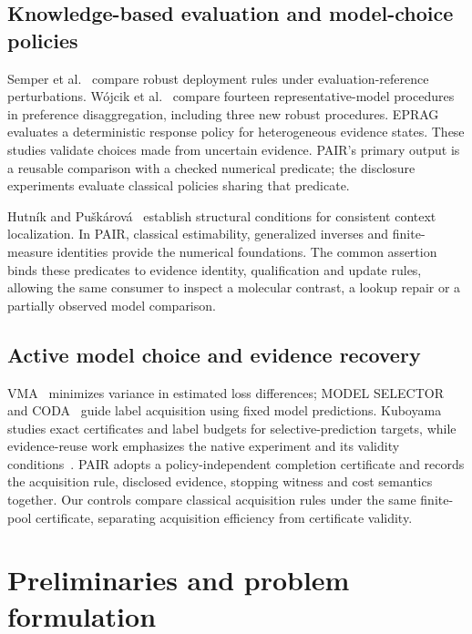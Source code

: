 \documentclass[preprint,12pt,number,sort&compress]{elsarticle}
\begin{document}
\subsection{Knowledge-based evaluation and model-choice policies}
Semper et al.~\cite{semper2026robust} compare robust deployment rules under evaluation-reference perturbations. W\'{o}jcik et al.~\cite{wojcik2023representative} compare fourteen representative-model procedures in preference disaggregation, including three new robust procedures. EPRAG~\cite{kinalioglu2026eprag} evaluates a deterministic response policy for heterogeneous evidence states. These studies validate choices made from uncertain evidence. PAIR's primary output is a reusable comparison with a checked numerical predicate; the disclosure experiments evaluate classical policies sharing that predicate.

Hutn\'{i}k and Pu\v{s}k\'{a}rov\'{a}~\cite{hutnik2026localization} establish structural conditions for consistent context localization. In PAIR, classical estimability, generalized inverses and finite-measure identities provide the numerical foundations. The common assertion binds these predicates to evidence identity, qualification and update rules, allowing the same consumer to inspect a molecular contrast, a lookup repair or a partially observed model comparison.

\subsection{Active model choice and evidence recovery}
VMA~\cite{hara2024vma} minimizes variance in estimated loss differences; MODEL SELECTOR~\cite{okanovic2025selector} and CODA~\cite{kay2025coda} guide label acquisition using fixed model predictions. Kuboyama~\cite{kuboyama2026labels} studies exact certificates and label budgets for selective-prediction targets, while evidence-reuse work emphasizes the native experiment and its validity conditions~\cite{li2026ownership}. PAIR adopts a policy-independent completion certificate and records the acquisition rule, disclosed evidence, stopping witness and cost semantics together. Our controls compare classical acquisition rules under the same finite-pool certificate, separating acquisition efficiency from certificate validity.

\section{Preliminaries and problem formulation}\label{sec:problem}
\end{document}
